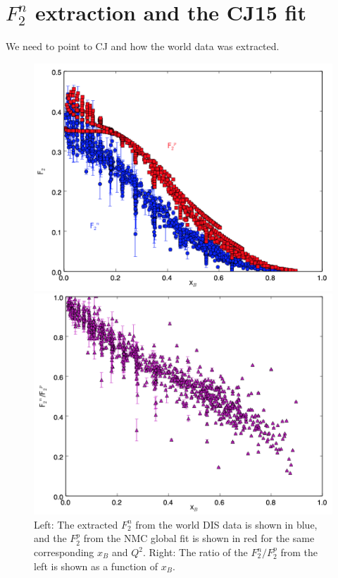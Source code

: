 \documentclass[oneside]{article}
\begin{document}
\section{$F_2^n$ extraction and the CJ15 fit}

We need to point to CJ and how the world data was extracted. 

 \begin{figure}
\begin{minipage}{0.5\textwidth}
 \includegraphics[width=\textwidth]{plots/f2np_plot.png}
\end{minipage}\hfill\begin{minipage}{0.5\textwidth}
 \includegraphics[width=\textwidth]{plots/f2npratio_plot.png}
 \end{minipage}
  \caption[$F_2^{n,p}$ characteristics]{Left: The extracted $F_2^n$ from the world DIS data is shown in blue, and the $F_2^p$ from the NMC global fit is shown in red for the same corresponding $x_B$ and $Q^2$. Right: The ratio of the $F_2^n/F_2^p$ from the left is shown as a function of $x_B$.}
  \label{fig:F2np_general}
\end{figure} 
 
\end{document}
